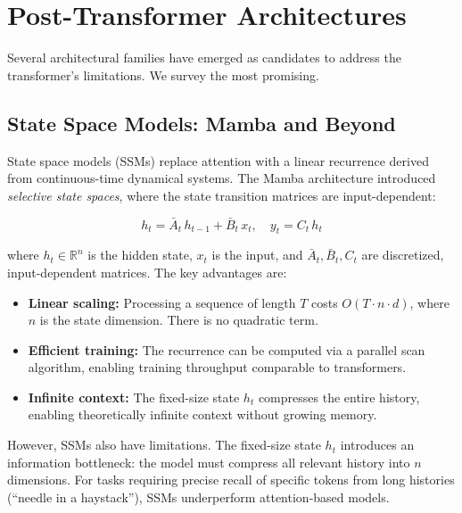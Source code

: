 \section{Post-Transformer Architectures}
\label{sec:post-transformer}

Several architectural families have emerged as candidates to address the transformer's limitations. We survey the most promising.

\subsection{State Space Models: Mamba and Beyond}

State space models (SSMs) replace attention with a linear recurrence derived from continuous-time dynamical systems. The Mamba architecture \citep{gu2023mamba} introduced \emph{selective state spaces}, where the state transition matrices are input-dependent:

\begin{equation}
h_t = \bar{A}_t \, h_{t-1} + \bar{B}_t \, x_t, \quad y_t = C_t \, h_t
\label{eq:ssm}
\end{equation}

where $h_t \in \mathbb{R}^n$ is the hidden state, $x_t$ is the input, and $\bar{A}_t, \bar{B}_t, C_t$ are discretized, input-dependent matrices. The key advantages are:

\begin{itemize}[leftmargin=1.8em]
  \item \textbf{Linear scaling:} Processing a sequence of length $T$ costs $O(T \cdot n \cdot d)$, where $n$ is the state dimension. There is no quadratic term.
  \item \textbf{Efficient training:} The recurrence can be computed via a parallel scan algorithm, enabling training throughput comparable to transformers.
  \item \textbf{Infinite context:} The fixed-size state $h_t$ compresses the entire history, enabling theoretically infinite context without growing memory.
\end{itemize}

However, SSMs also have limitations. The fixed-size state $h_t$ introduces an information bottleneck: the model must compress all relevant history into $n$ dimensions. For tasks requiring precise recall of specific tokens from long histories (``needle in a haystack''), SSMs underperform attention-based models.

